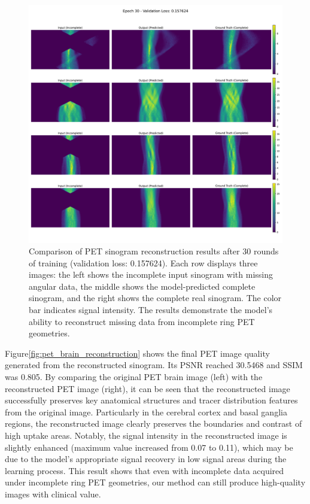 \documentclass[12pt]{iopart}
\begin{document}
\begin{figure}[ht]
    \centering
    \includegraphics[width=\textwidth]{Images/epoch_030.pdf}
    \vspace{-1cm}
    \caption{Comparison of PET sinogram reconstruction results after 30 rounds of training (validation loss: 0.157624). Each row displays three images: the left shows the incomplete input sinogram with missing angular data, the middle shows the model-predicted complete sinogram, and the right shows the complete real sinogram. The color bar indicates signal intensity. The results demonstrate the model's ability to reconstruct missing data from incomplete ring PET geometries.}
    \label{fig:pet_reconstruction_results}
\end{figure}
Figure\ref{fig:pet_brain_reconstruction} shows the final PET image quality generated from the reconstructed sinogram. Its PSNR reached 30.5468 and SSIM was 0.805. By comparing the original PET brain image (left) with the reconstructed PET image (right), it can be seen that the reconstructed image successfully preserves key anatomical structures and tracer distribution features from the original image. Particularly in the cerebral cortex and basal ganglia regions, the reconstructed image clearly preserves the boundaries and contrast of high uptake areas. Notably, the signal intensity in the reconstructed image is slightly enhanced (maximum value increased from 0.07 to 0.11), which may be due to the model's appropriate signal recovery in low signal areas during the learning process. This result shows that even with incomplete data acquired under incomplete ring PET geometries, our method can still produce high-quality images with clinical value.
\end{document}
